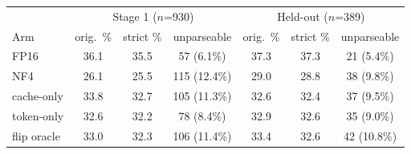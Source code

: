 \begin{tabular}{lcccccc}
\toprule
 & \multicolumn{3}{c}{Stage 1 ($n$=930)} & \multicolumn{3}{c}{Held-out ($n$=389)} \\
Arm & orig.\ \% & strict \% & unparseable & orig.\ \% & strict \% & unparseable \\
\midrule
FP16 & 36.1 & 35.5 & 57 (6.1\%) & 37.3 & 37.3 & 21 (5.4\%) \\
NF4 & 26.1 & 25.5 & 115 (12.4\%) & 29.0 & 28.8 & 38 (9.8\%) \\
cache-only & 33.8 & 32.7 & 105 (11.3\%) & 32.6 & 32.4 & 37 (9.5\%) \\
token-only & 32.6 & 32.2 & 78 (8.4\%) & 32.9 & 32.6 & 35 (9.0\%) \\
flip oracle & 33.0 & 32.3 & 106 (11.4\%) & 33.4 & 32.6 & 42 (10.8\%) \\
\bottomrule
\end{tabular}
